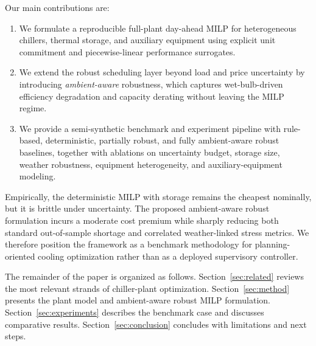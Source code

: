 Our main contributions are:
\begin{enumerate}[leftmargin=1.5em]
    \item We formulate a reproducible full-plant day-ahead MILP for heterogeneous chillers, thermal storage, and auxiliary equipment using explicit unit commitment and piecewise-linear performance surrogates.
    \item We extend the robust scheduling layer beyond load and price uncertainty by introducing \emph{ambient-aware} robustness, which captures wet-bulb-driven efficiency degradation and capacity derating without leaving the MILP regime.
    \item We provide a semi-synthetic benchmark and experiment pipeline with rule-based, deterministic, partially robust, and fully ambient-aware robust baselines, together with ablations on uncertainty budget, storage size, weather robustness, equipment heterogeneity, and auxiliary-equipment modeling.
\end{enumerate}

Empirically, the deterministic MILP with storage remains the cheapest nominally, but it is brittle under uncertainty. The proposed ambient-aware robust formulation incurs a moderate cost premium while sharply reducing both standard out-of-sample shortage and correlated weather-linked stress metrics. We therefore position the framework as a benchmark methodology for planning-oriented cooling optimization rather than as a deployed supervisory controller.

The remainder of the paper is organized as follows. Section~\ref{sec:related} reviews the most relevant strands of chiller-plant optimization. Section~\ref{sec:method} presents the plant model and ambient-aware robust MILP formulation. Section~\ref{sec:experiments} describes the benchmark case and discusses comparative results. Section~\ref{sec:conclusion} concludes with limitations and next steps.
